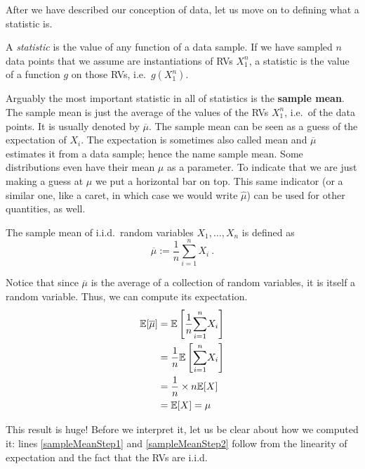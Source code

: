 After we have described our conception of data, let us move on to defining what a statistic is.

\begin{Definition}
A \emph{statistic} is the value of any function of a data sample. If we have sampled $ n $ data points that we assume are instantiations of RVs
$ X_{1}^{n} $, a statistic is the value of a function $ g $ on those RVs, i.e.\ $ g(X_{1}^{n}) $.
\end{Definition}

Arguably the most important statistic in all of statistics is the \textbf{sample mean}. The sample mean is just the average of the
values of the RVs $ X_{1}^{n} $, i.e.\ of the data points. It is usually denoted by $ \overline{\mu} $. The
sample mean can be seen as a guess of the expectation of $ X_{i} $. The expectation is sometimes also
called mean and $ \overline{\mu} $ estimates it from a data sample; hence the name sample mean. Some distributions even have their
mean $ \mu $ as a parameter. To indicate that we are just making a guess at $ \mu $ we put a horizontal bar on top.
This same indicator (or a similar one, like a caret, in which case we would write $ \hat{\mu} $) can be used for other quantities, as well.

\begin{Definition}
The sample mean of i.i.d.\ random variables $ X_{1}, \ldots, X_{n} $ is defined as 
$$ \overline{\mu} := \dfrac{1}{n}\underset{i=1}{\overset{n}{\sum}} X_{i} \ . $$
\end{Definition}

Notice that since $ \overline{\mu} $ is the average of a collection of random variables, it is itself a random variable. Thus, we can
compute its expectation.
\begin{align}
\mathbb{E}[\overline{\mu}] &= \mathbb{E}\left[\dfrac{1}{n} \underset{i=1}{\overset{n}{\sum}} X_{i}\right] \label{eq:sampleMeanBegin} \\
&= \dfrac{1}{n} \mathbb{E}\left[\underset{i=1}{\overset{n}{\sum}} X_{i}\right] \label{sampleMeanStep1} \\
&= \dfrac{1}{n} \times n \mathbb{E}[X] \label{sampleMeanStep2} \\
&= \mathbb{E}[X] = \mu \label{eq:sampleMeanEnd}
\end{align}

This result is huge! Before we interpret it, let us be clear about how we computed it: lines \eqref{sampleMeanStep1} and
\eqref{sampleMeanStep2} follow from the linearity of expectation and the fact that the RVs are i.i.d. 

